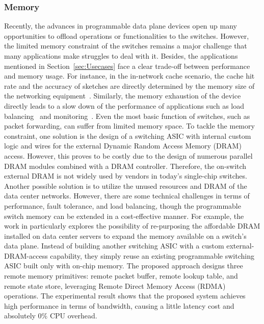 \subsubsection{Memory} \noindent Recently, the advances in programmable data plane devices open up many opportunities to offload operations or functionalities to the switches. However, the limited memory constraint of the switches remains a major challenge that many applications make struggles to deal with it. Besides, the applications mentioned in Section~\ref{sec:Usecases} face a clear trade-off between performance and memory usage. For instance, in the in-network cache scenario, the cache hit rate and the accuracy of sketches are directly determined by the memory size of the networking equipment~\cite{jin2017netcache, liu2016one}. Similarly, the memory exhaustion of the device directly leads to a slow down of the performance of applications such as load balancing~\cite{miao2017silkroad} and monitoring~\cite{narayana2017language}. Even the most basic function of switches, such as packet forwarding, can suffer from limited memory space. To tackle the memory constraint, one solution is the design of a switching ASIC with internal custom logic and wires for the external Dynamic Random Access Memory (DRAM) access. However, this proves to be costly due to the design of numerous parallel DRAM modules combined with a DRAM controller. Therefore, the on-switch external DRAM is not widely used by vendors in today’s single-chip switches. Another possible solution is to utilize the unused resources and DRAM of the data center networks. However, there are some technical challenges in terms of performance, fault tolerance, and load balancing, though the programmable switch memory can be extended in a cost-effective manner. For example, the work in \cite{kim2020unleashing} particularly explores the possibility of re-purposing the affordable DRAM installed on data center servers to expand the memory available on a switch’s data plane. Instead of building another switching ASIC with a custom external-DRAM-access capability, they simply reuse an existing programmable switching ASIC built only with on-chip memory. The proposed approach designs three remote memory primitives: remote packet buffer, remote lookup table, and remote state store, leveraging Remote Direct Memory Access (RDMA) operations. The experimental result shows that the proposed system achieves high performance in terms of bandwidth, causing a little latency cost and absolutely 0\%  CPU overhead.

